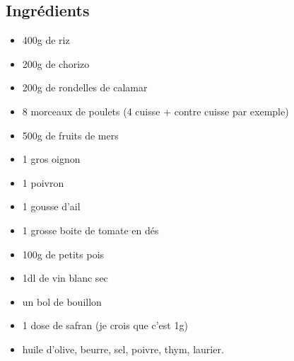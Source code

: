 \subsection*{Ingrédients}
\begin{itemize}
\item 400g de riz
\item 200g de chorizo
\item 200g de rondelles de calamar
\item 8 morceaux de poulets (4 cuisse + contre cuisse par exemple)
\item 500g de fruits de mers
\item 1 gros oignon
\item 1 poivron
\item 1 gousse d'ail
\item 1 grosse boite de tomate en dés
\item 100g de petits pois
\item 1dl de vin blanc sec
\item un bol de bouillon
\item 1 dose de safran (je crois que c'est 1g)
\item huile d'olive, beurre, sel, poivre, thym, laurier.
\end{itemize}

